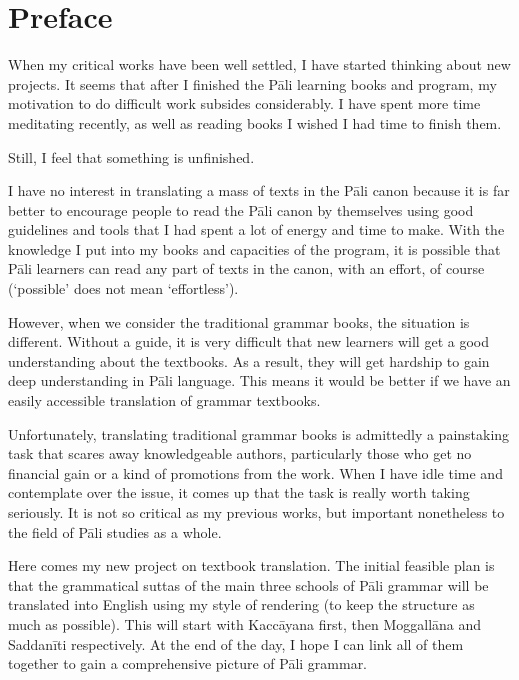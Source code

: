 \cleardoublepage
{}
{}
\chapter*{Preface}

When my critical works have been well settled, I have started thinking about new projects. It seems that after I finished the Pāli learning books and program, my motivation to do difficult work subsides considerably. I have spent more time meditating recently, as well as reading books I wished I had time to finish them.

Still, I feel that something is unfinished.

I have no interest in translating a mass of texts in the Pāli canon because it is far better to encourage people to read the Pāli canon by themselves using good guidelines and tools that I had spent a lot of energy and time to make. With the knowledge I put into my books and capacities of the program, it is possible that Pāli learners can read any part of texts in the canon, with an effort, of course (`possible' does not mean `effortless').

However, when we consider the traditional grammar books, the situation is different. Without a guide, it is very difficult that new learners will get a good understanding about the textbooks. As a result, they will get hardship to gain deep understanding in Pāli language. This means it would be better if we have an easily accessible translation of grammar textbooks.

Unfortunately, translating traditional grammar books is admittedly a painstaking task that scares away knowledgeable authors, particularly those who get no financial gain or a kind of promotions from the work. When I have idle time and contemplate over the issue, it comes up that the task is really worth taking seriously. It is not so critical as my previous works, but important nonetheless to the field of Pāli studies as a whole.

Here comes my new project on textbook translation. The initial feasible plan is that the grammatical suttas of the main three schools of Pāli grammar will be translated into English using my style of rendering (to keep the structure as much as possible). This will start with Kaccāyana first, then Moggallāna and Saddanīti respectively. At the end of the day, I hope I can link all of them together to gain a comprehensive picture of Pāli grammar.

